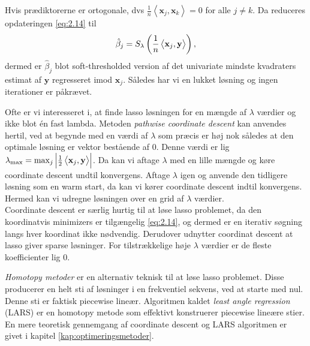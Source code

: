 Hvis prædiktorerne er ortogonale, dvs $\frac{1}{n} \left\langle \mathbf{x}_j, \mathbf{x}_k \right\rangle = 0$ for alle $j \neq k$.
Da reduceres opdateringen \eqref{eq:2.14} til
\begin{align}
\hat{\beta}_j = S_\lambda \del{\frac{1}{n} \left\langle \mathbf{x}_j, \mathbf{y} \right\rangle}, \label{eq:ortogonal_lasso}
\end{align}
dermed er $\hat{\beta}_j$ blot soft-thresholded version af det univariate mindste kvadraters estimat af $\mathbf{y}$ regresseret imod $\mathbf{x}_j$. Således har vi en lukket løsning og ingen iterationer er påkrævet.

Ofte er vi interesseret i, at finde lasso løsningen for en mængde af \(\lambda\) værdier og ikke blot én fast lambda.
Metoden \textit{pathwise coordinate descent} kan anvendes hertil, ved at begynde med en værdi af \(\lambda\) som præcis er høj nok således at den optimale løsning er vektor bestående af \(0\).
Denne værdi er lig \(\lambda_{\max}=\max_j \left\vert \frac{1}{2} \left\langle \mathbf{x}_j, \mathbf{y} \right\rangle \right\vert\).
Da kan vi aftage \(\lambda\) med en lille mængde og køre coordinate descent undtil konvergens.
Aftage \(\lambda\) igen og anvende den tidligere løsning som en warm start, da kan vi kører coordinate descent indtil konvergens.
Hermed kan vi udregne løsningen over en grid af \(\lambda\) værdier. \\

Coordinate descent er særlig hurtig til at løse lasso problemet, da den koordinatvis minimizers er tilgængelig \eqref{eq:2.14}, og dermed er en iterativ søgning langs hver koordinat ikke nødvendig.
Derudover udnytter coordinat descent at lasso giver sparse løsninger.
For tilstrækkelige høje \(\lambda\) værdier er de fleste koefficienter lig $0$.

\textit{Homotopy metoder} er en alternativ teknisk til at løse lasso problemet. Disse producerer en helt sti af løsninger i en frekventiel sekvens, ved at starte med nul.
Denne sti er faktisk piecewise lineær.
Algoritmen kaldet \textit{least angle regression} (LARS) er en homotopy metode som effektivt konstruerer piecewise lineære stier.
En mere teoretisk gennemgang af coordinate descent og LARS algoritmen er givet i kapitel \ref{kap:optimeringsmetoder}.
%
